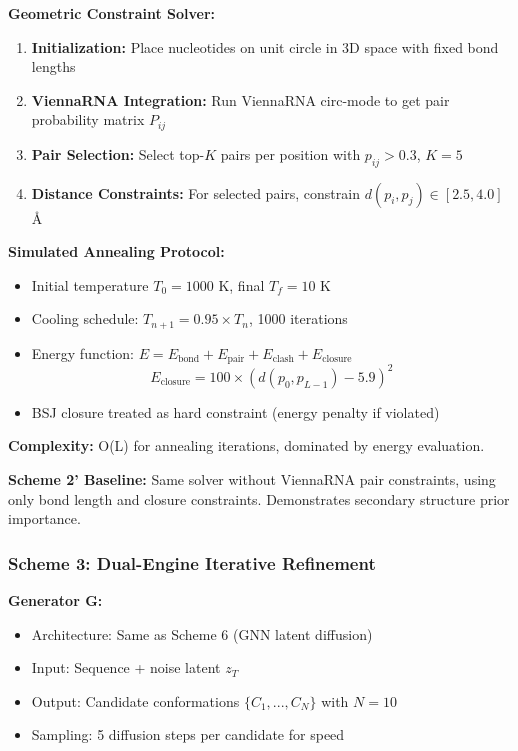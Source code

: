 \documentclass[12pt]{article}
\begin{document}
\textbf{Geometric Constraint Solver:}
\begin{enumerate}
\item \textbf{Initialization:} Place nucleotides on unit circle in 3D space with fixed bond lengths
\item \textbf{ViennaRNA Integration:} Run ViennaRNA circ-mode to get pair probability matrix $P_{ij}$
\item \textbf{Pair Selection:} Select top-$K$ pairs per position with $p_{ij} > 0.3$, $K=5$
\item \textbf{Distance Constraints:} For selected pairs, constrain $d(p_i, p_j) \in [2.5, 4.0]$\AA
\end{enumerate}

\textbf{Simulated Annealing Protocol:}
\begin{itemize}
\item Initial temperature $T_0 = 1000$ K, final $T_f = 10$ K
\item Cooling schedule: $T_{n+1} = 0.95 \times T_n$, 1000 iterations
\item Energy function: $E = E_{\text{bond}} + E_{\text{pair}} + E_{\text{clash}} + E_{\text{closure}}$
\begin{equation}
E_{\text{closure}} = 100 \times (d(p_0, p_{L-1}) - 5.9)^2
\end{equation}
\item BSJ closure treated as hard constraint (energy penalty if violated)
\end{itemize}

\textbf{Complexity:} O(L) for annealing iterations, dominated by energy evaluation.

\textbf{Scheme 2' Baseline:} Same solver without ViennaRNA pair constraints, using only bond length and closure constraints. Demonstrates secondary structure prior importance.

\subsubsection{Scheme 3: Dual-Engine Iterative Refinement}

\textbf{Generator G:}
\begin{itemize}
\item Architecture: Same as Scheme 6 (GNN latent diffusion)
\item Input: Sequence + noise latent $z_T$
\item Output: Candidate conformations $\{C_1, ..., C_N\}$ with $N=10$
\item Sampling: 5 diffusion steps per candidate for speed
\end{itemize}
\end{document}

